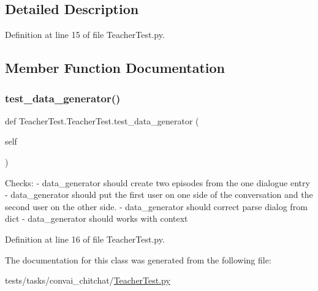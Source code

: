 \subsection{Detailed Description}


Definition at line 15 of file Teacher\+Test.\+py.



\subsection{Member Function Documentation}
\mbox{\label{classTeacherTest_1_1TeacherTest_aeb5a6c83bfa0e5eb8d8fad13789421aa}} 
\subsubsection{\texorpdfstring{test\+\_\+data\+\_\+generator()}{test\_data\_generator()}}
{\footnotesize\ttfamily def Teacher\+Test.\+Teacher\+Test.\+test\+\_\+data\+\_\+generator (\begin{DoxyParamCaption}\item[{}]{self }\end{DoxyParamCaption})}

\begin{DoxyVerb}Checks:
- data_generator should create two episodes from the one dialogue entry
- data_generator should put the first user on one side of the
  conversation and the second user on the other side.
- data_generator should correct parse dialog from dict
- data_generator should works with context
\end{DoxyVerb}
 

Definition at line 16 of file Teacher\+Test.\+py.



The documentation for this class was generated from the following file\+:\begin{DoxyCompactItemize}
\item 
tests/tasks/convai\+\_\+chitchat/\hyperlink{TeacherTest_8py}{Teacher\+Test.\+py}\end{DoxyCompactItemize}
